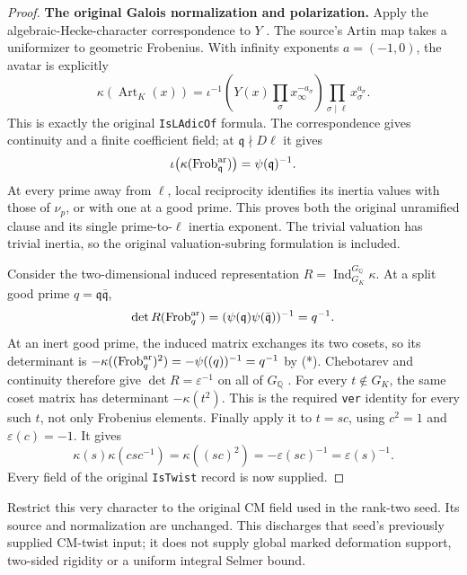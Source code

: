 \begin{proof}
\par\medskip\noindent\textbf{The original Galois normalization and polarization.}
Apply the algebraic-Hecke-character correspondence to $Y$
\cite{cm-twist-cht}.  The source's Artin map takes a uniformizer
to geometric Frobenius.  With infinity exponents $a=(-1,0)$,
the avatar is explicitly
\[
 \kappa(\operatorname{Art}_K(x))
 =\iota^{-1}\!\left(Y(x)\prod_\sigma x_\infty^{-a_\sigma}\right)
                         \prod_{\sigma\mid\ell}x_\sigma^{a_\sigma}.
\]
This is exactly the original \texttt{IsLAdicOf} formula.
The correspondence gives continuity and a finite coefficient field;
at $\mathfrak q\nmid D\ell$ it gives
\[
       \iota\bigl(\kappa(\operatorname{Frob}_{\mathfrak q}^{\rm ar})\bigr)
                                  =\psi(\mathfrak q)^{-1}.
\]
At every prime away from $\ell$, local reciprocity identifies its
inertia values with those of $\nu_p$, or with one at a good prime.
This proves both the original unramified clause and its single
prime-to-$\ell$ inertia exponent.  The trivial valuation has trivial
inertia, so the original valuation-subring formulation is included.

Consider the two-dimensional induced representation
$R=\operatorname{Ind}_{G_K}^{G_{\mathbb Q}}\kappa$.
At a split good prime $q=\mathfrak q\bar{\mathfrak q}$,
\[
       \det R(\operatorname{Frob}_q^{\rm ar})
         =(\psi(\mathfrak q)\psi(\bar{\mathfrak q}))^{-1}=q^{-1}.
\]
At an inert good prime, the induced matrix exchanges its two cosets,
so its determinant is
$-\kappa((\operatorname{Frob}_q^{\rm ar})^2)
 =-\psi((q))^{-1}=q^{-1}$ by (*).
Chebotarev and continuity therefore give
$\det R=\varepsilon^{-1}$ on all of $G_{\mathbb Q}$
\cite{cm-twist-cft}.  For every $t\notin G_K$, the same coset
matrix has determinant $-\kappa(t^2)$.  This is the required
\texttt{ver} identity for every such $t$, not only Frobenius elements.
Finally apply it to $t=sc$, using $c^2=1$ and
$\varepsilon(c)=-1$.  It gives
\[
      \kappa(s)\kappa(csc^{-1})
       =\kappa((sc)^2)=-\varepsilon(sc)^{-1}
       =\varepsilon(s)^{-1}.
\]
Every field of the original \texttt{IsTwist} record is now supplied.
\end{proof}

Restrict this very character to the original CM field used in the
rank-two seed.  Its source and normalization are unchanged.  This
discharges that seed's previously supplied CM-twist input; it does
not supply global marked deformation support, two-sided rigidity
or a uniform integral Selmer bound.
